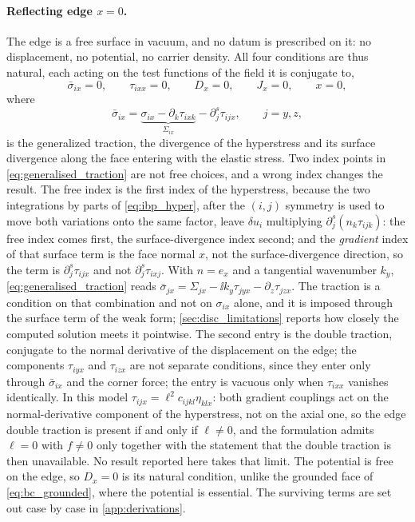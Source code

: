 \paragraph{Reflecting edge $x=0$.}  The edge is a free surface in vacuum, and no
datum is prescribed on it: no displacement, no potential, no carrier density.
All four conditions are thus natural, each acting on the test functions of
the field it is conjugate to,
\begin{equation}
\label{eq:bc_edge}
\bar\sigma_{ix}=0,\qquad \tau_{ixx}=0,\qquad D_x=0,\qquad J_x=0,\qquad x=0 ,
\end{equation}
where
\begin{equation}
\label{eq:generalised_traction}
\bar\sigma_{ix}=\underbrace{\sigma_{ix}-\partial_k\tau_{ixk}}_{\Sigma_{ix}}
-\partial_j^{s}\tau_{ijx},\qquad j=y,z,
\end{equation}
is the generalized traction, the divergence of the hyperstress and its surface
divergence along the face entering with the elastic stress.  Two index points in
\eqref{eq:generalised_traction} are not free choices, and a wrong index changes the result.
The free index is the first index of the hyperstress, because the two integrations
by parts of \eqref{eq:ibp_hyper}, after the $(i,j)$ symmetry is used to move both
variations onto the same factor, leave $\delta u_i$ multiplying
$\partial_j^{s}(n_k\tau_{ijk})$: the free index comes first, the
surface-divergence index second; and the \emph{gradient} index of that surface
term is the face normal $x$, not the surface-divergence direction, so the term is
$\partial_j^s\tau_{ijx}$ and not $\partial_j^s\tau_{ixj}$.  With $n=e_x$ and a
tangential wavenumber $k_y$,
\eqref{eq:generalised_traction} reads
$\bar\sigma_{jx}=\Sigma_{jx}-\ii k_y\tau_{jyx}-\partial_z\tau_{jzx}$.
The traction is a condition on that combination and not on $\sigma_{ix}$ alone,
and it is imposed through the surface term of the weak form; \cref{sec:disc_limitations} reports how closely the computed
solution meets it pointwise.  The second entry is the double traction, conjugate to the
normal derivative of the displacement on the edge; the components $\tau_{iyx}$ and
$\tau_{izx}$ are not separate conditions, since they enter only through
$\bar\sigma_{ix}$ and the corner force; the entry is vacuous only when
$\tau_{ixx}$ vanishes identically.  In this model
$\tau_{ijx}=\ell^{2}c_{ijkl}\eta_{klx}$: both gradient couplings act on the
normal-derivative component of the hyperstress, not on the axial one, so the edge
double traction is present if and only if $\ell\neq0$, and the formulation admits
$\ell=0$ with $f\neq0$ only together with the statement that the double traction
is then unavailable.  No result reported here takes that limit.  The potential is
free on the edge, so $D_x=0$ is its natural condition, unlike the grounded
face of \eqref{eq:bc_grounded}, where the potential is essential.
The surviving terms are set out case by case in \cref{app:derivations}.


